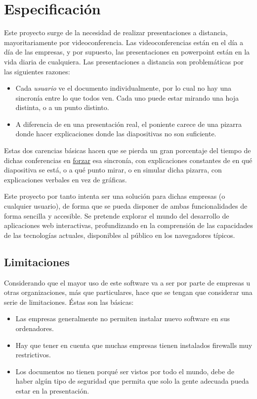 \section{Especificaci\'on} %
\label{sec:especificacion}

Este proyecto surge de la necesidad de realizar presentaciones a distancia, mayoritariamente por videoconferencia. Las videoconferencias están en el día a día de las empresas, y por supuesto, las presentaciones en powerpoint están en la vida diaria de cualquiera. Las presentaciones a distancia son problemáticas por las siguientes razones:

\begin{itemize}
	\item Cada \emph{usuario} ve el documento individualmente, por lo cual no hay una sincronía entre lo que todos ven. Cada uno puede estar mirando una hoja distinta, o a un punto distinto.
	\item A diferencia de en una presentación real, el poniente carece de una pizarra donde hacer explicaciones donde las diapositivas no son suficiente.
\end{itemize}

Estas dos carencias básicas hacen que se pierda un gran porcentaje del tiempo de dichas conferencias en \underline{forzar} esa sincronía, con explicaciones constantes de en qué diapositiva se está, o a qué punto mirar, o en simular dicha pizarra, con explicaciones verbales en vez de gráficas.

Este proyecto por tanto intenta ser una solución para dichas empresas (o cualquier usuario), de forma que se pueda disponer de ambas funcionalidades de forma sencilla y accesible. Se pretende explorar el mundo del desarrollo de aplicaciones web interactivas, profundizando en la comprensión de las capacidades de las tecnologías actuales, disponibles al público en los navegadores típicos.

\subsection{Limitaciones}
Considerando que el mayor uso de este software va a ser por parte de empresas u otras organizaciones, más que particulares, hace que se tengan que considerar una serie de limitaciones. Éstas son las básicas:

\begin{itemize}
	\item Las empresas generalmente no permiten instalar nuevo software en sus ordenadores.
	\item Hay que tener en cuenta que muchas empresas tienen instalados firewalls muy restrictivos.
	\item Los documentos no tienen porqué ser vistos por todo el mundo, debe de haber algún tipo de seguridad que permita que solo la gente adecuada pueda estar en la presentación.
\end{itemize}


